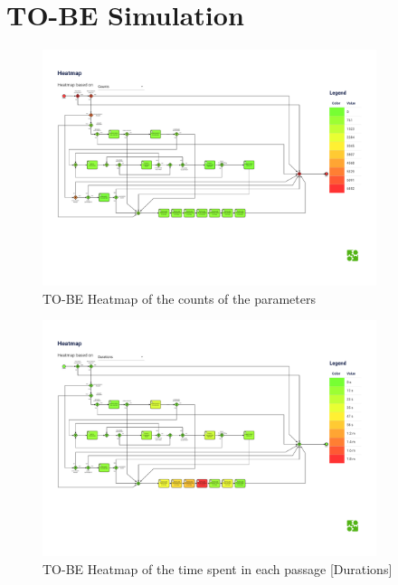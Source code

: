 \section{TO-BE Simulation}
\label{sec:to_be_simulation}




\begin{figure}[H]
    \centering
    \includegraphics[width=0.87\textwidth]{figures/TO-BE heatmap_counts.pdf}
    \caption{TO-BE Heatmap of the counts of the parameters}
    \label{fig:to_be_heatmap_counts}
\end{figure}

\begin{figure}[H]
    \centering
    \includegraphics[width=0.87\textwidth]{figures/TO-BE heatmap_durations.pdf}
    \caption{TO-BE Heatmap of the time spent in each passage [Durations]}
    \label{fig:to_be_heatmap_durations}
\end{figure}

